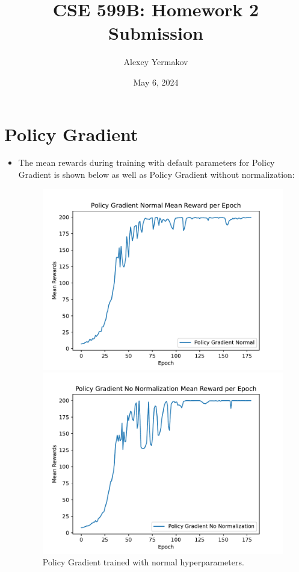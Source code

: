 \documentclass[12pt]{article}
\title{CSE 599B: Homework 2 Submission}
\author{Alexey Yermakov}
\date{May 6, 2024}
\newcommand{\0}{\boldsymbol{0}}
\newcommand{\1}{\boldsymbol{1}}
\begin{document}
\maketitle

\section{Policy Gradient}

\begin{itemize}
    \item The mean rewards during training with default parameters for Policy Gradient is shown below as well as Policy Gradient without normalization:

    \begin{figure}[H]
        \centering
        \begin{minipage}{0.45\textwidth}
            \centering
            \includegraphics[width=1.0\linewidth]{../figs/pg_normal.pdf}
            \caption{Policy Gradient trained with normal hyperparameters.}
            \label{fig:fig1}
        \end{minipage}
        \hspace{0.05\linewidth}
        \begin{minipage}{0.45\textwidth}
            \centering
            \includegraphics[width=1.0\linewidth]{../figs/pg_nonorm.pdf}

\end{minipage}
\end{figure}
\end{itemize}
\end{document}
